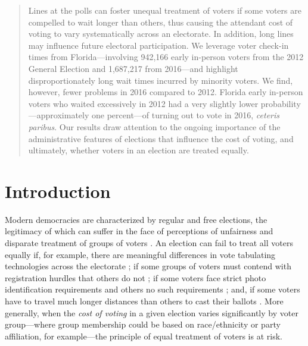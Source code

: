 \documentclass[12pt,titlepage]{article}
\begin{document}
\begin{abstract}
  \noindent 
  Lines at the polls can foster unequal treatment of voters if some
  voters are compelled to wait longer than others, thus causing the
  attendant cost of voting to vary systematically across an
  electorate. In addition, long lines may influence future electoral
  participation.  We leverage voter check-in times from
  Florida---involving 942,166 early in-person voters from the 2012
  General Election and 1,687,217 from 2016---and highlight
  disproportionately long wait times incurred by minority voters. We
  find, however, fewer problems in 2016 compared to 2012. Florida
  early in-person voters who waited
  excessively in 2012 had a very slightly lower
  probability---approximately one percent---of turning out to vote in
  2016, \emph{ceteris paribus}.  Our results draw attention to the
  ongoing importance of the administrative features of elections that
  influence the cost of voting, and ultimately, whether voters in an
  election are treated equally.
\end{abstract}



\newpage
\section*{Introduction}

Modern democracies are characterized by regular and free elections,
the legitimacy of which can suffer in the face of perceptions of
unfairness and disparate treatment of groups of voters
\citep{norris2014electoral}.  An election can fail to treat all voters
equally if, for example, there are meaningful differences in vote
tabulating technologies across the electorate
\citep[e.g.,][]{kimballkropf:tech}; if some groups of voters must
contend with registration hurdles that others do not
\cite[e.g.,][]{ansolhersh:registration}; if some voters face strict
photo identification requirements and others no such requirements
\citep[e.g.,][]{benteleetal:newjimcrow}; and, if some voters have to
travel much longer distances than others to cast their ballots
\citep[e.g.,][]{dyckgimpel:distance}.  More generally, when the
\emph{cost of voting} in a given election varies significantly by
voter group---where group membership could be based on race/ethnicity
or party affiliation, for example---the principle of equal treatment
of voters is at risk.
\end{document}

